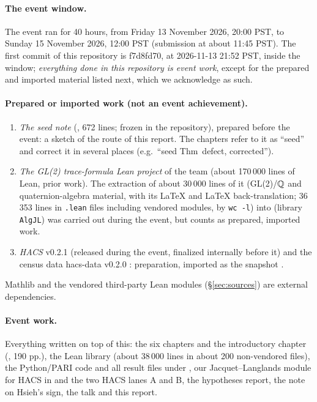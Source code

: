 \paragraph{The event window.} The event ran for 40 hours, from Friday 13 November 2026, 20:00 PST, to
Sunday 15 November 2026, 12:00 PST (submission at about 11:45 PST). The first commit of this repository is f7d8fd70, at 2026-11-13 21:52 PST,
inside the window; \emph{everything done in this repository is event work}, except for the prepared and imported material
listed next, which we acknowledge as such.

\paragraph{Prepared or imported work (not an event achievement).}
\begin{enumerate}[label=(\alph*)]
\item \emph{The seed note}  (, 672 lines; frozen in the repository),
  prepared before the event: a sketch of the route of this report. The chapters refer to it as ``seed'' and correct it in
  several places (e.g.\ ``seed Thm~defect, corrected'').
\item \emph{The GL(2) trace-formula Lean project} of the team (about 170\,000 lines of Lean, prior work). The extraction of
  about 30\,000 lines of it (GL(2)/$\mathbb{Q}$ and quaternion-algebra material, with its LaTeX and LaTeX back-translation; 36\,353
  lines in \texttt{.lean} files including vendored modules, by \texttt{wc -l}) into 
  (library \texttt{AlgJL}) was carried out during the event, but counts as prepared, imported work.
\item \emph{HACS} v0.2.1 \cite{HACS021} (released during the event, finalized internally before it) and the census data
  hacs-data v0.2.0 \cite{HACSdata020}: preparation, imported as the snapshot .
\end{enumerate}
Mathlib and the vendored third-party Lean modules (\S\ref{sec:sources}) are external dependencies.

\paragraph{Event work.} Everything written on top of this: the six chapters and the introductory
chapter (\mainpdf, 190 pp.), the Lean library  (about 38\,000 lines in about 200 non-vendored files), the Python/PARI code and
all result files under , our Jacquet--Langlands module for HACS in  and the two HACS lanes
A and B, the hypotheses report, the note on Hsieh's sign, the talk and this report.

